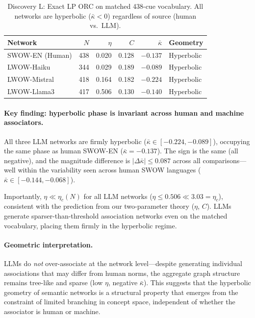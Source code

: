 \documentclass[11pt,a4paper]{article}
\newcommand{\kbar}{\bar{\kappa}}
\begin{document}
\begin{table}[h]
\centering
\caption{Discovery L: Exact LP ORC on matched 438-cue vocabulary. All networks are
hyperbolic ($\bar{\kappa}<0$) regardless of source (human vs.\ LLM).}
\label{tab:discovery_l}
\begin{tabular}{@{}lrrrrl@{}}
\toprule
Network & $N$ & $\eta$ & $C$ & $\kbar$ & Geometry \\
\midrule
SWOW-EN (Human) & 438 & 0.020 & 0.128 & $-0.137$ & Hyperbolic \\
LWOW-Haiku & 344 & 0.029 & 0.189 & $-0.089$ & Hyperbolic \\
LWOW-Mistral & 418 & 0.164 & 0.182 & $-0.224$ & Hyperbolic \\
LWOW-Llama3 & 417 & 0.506 & 0.130 & $-0.140$ & Hyperbolic \\
\bottomrule
\end{tabular}
\end{table}

\paragraph{Key finding: hyperbolic phase is invariant across human and machine associators.}
All three LLM networks are firmly hyperbolic ($\bar{\kappa} \in [-0.224, -0.089]$),
occupying the same phase as human SWOW-EN ($\bar{\kappa}=-0.137$).
The sign is the same (all negative), and the magnitude difference is
$|\Delta\bar{\kappa}| \leq 0.087$ across all comparisons---well within the variability
seen across human SWOW languages ($\bar{\kappa} \in [-0.144, -0.068]$).

Importantly, $\eta \ll \eta_c(N)$ for all LLM networks ($\eta \leq 0.506 \ll 3.03 = \eta_c$),
consistent with the prediction from our two-parameter theory ($\eta$, $C$).
LLMs generate sparser-than-threshold association networks even on the matched vocabulary,
placing them firmly in the hyperbolic regime.

\paragraph{Geometric interpretation.}
LLMs do \emph{not} over-associate at the network level---despite generating
individual associations that may differ from human norms, the aggregate graph
structure remains tree-like and sparse (low $\eta$, negative $\bar{\kappa}$).
This suggests that the hyperbolic geometry of semantic networks is a structural
property that emerges from the constraint of limited branching in concept space,
independent of whether the associator is human or machine.
\end{document}
